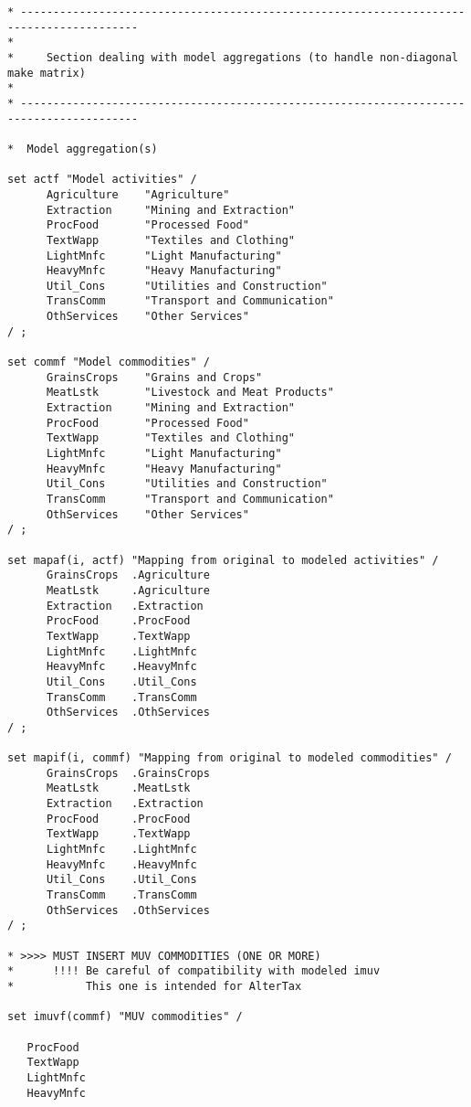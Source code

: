 \begin{lstlisting}[language=GAMS, caption={Sets for model aggregation}, label=lst:ModAgg]
* ----------------------------------------------------------------------------------------
*
*     Section dealing with model aggregations (to handle non-diagonal make matrix)
*
* ----------------------------------------------------------------------------------------

*  Model aggregation(s)

set actf "Model activities" /
      Agriculture    "Agriculture"
      Extraction     "Mining and Extraction"
      ProcFood       "Processed Food"
      TextWapp       "Textiles and Clothing"
      LightMnfc      "Light Manufacturing"
      HeavyMnfc      "Heavy Manufacturing"
      Util_Cons      "Utilities and Construction"
      TransComm      "Transport and Communication"
      OthServices    "Other Services"
/ ;

set commf "Model commodities" /
      GrainsCrops    "Grains and Crops"
      MeatLstk       "Livestock and Meat Products"
      Extraction     "Mining and Extraction"
      ProcFood       "Processed Food"
      TextWapp       "Textiles and Clothing"
      LightMnfc      "Light Manufacturing"
      HeavyMnfc      "Heavy Manufacturing"
      Util_Cons      "Utilities and Construction"
      TransComm      "Transport and Communication"
      OthServices    "Other Services"
/ ;

set mapaf(i, actf) "Mapping from original to modeled activities" /
      GrainsCrops  .Agriculture
      MeatLstk     .Agriculture
      Extraction   .Extraction
      ProcFood     .ProcFood
      TextWapp     .TextWapp
      LightMnfc    .LightMnfc
      HeavyMnfc    .HeavyMnfc
      Util_Cons    .Util_Cons
      TransComm    .TransComm
      OthServices  .OthServices
/ ;

set mapif(i, commf) "Mapping from original to modeled commodities" /
      GrainsCrops  .GrainsCrops
      MeatLstk     .MeatLstk
      Extraction   .Extraction
      ProcFood     .ProcFood
      TextWapp     .TextWapp
      LightMnfc    .LightMnfc
      HeavyMnfc    .HeavyMnfc
      Util_Cons    .Util_Cons
      TransComm    .TransComm
      OthServices  .OthServices
/ ;

* >>>> MUST INSERT MUV COMMODITIES (ONE OR MORE)
*      !!!! Be careful of compatibility with modeled imuv
*           This one is intended for AlterTax

set imuvf(commf) "MUV commodities" /

   ProcFood
   TextWapp
   LightMnfc
   HeavyMnfc


\end{lstlisting}
